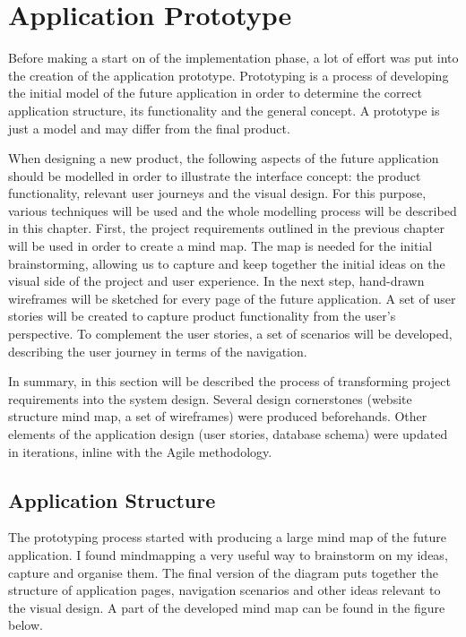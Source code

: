 \chapter{Application Prototype}
\label{ch:Prototype}
Before making a start on of the implementation phase, a lot of effort was put into the creation of the application prototype. Prototyping is a process of developing the initial model of the future application in order to determine the correct application structure, its functionality and the general concept. A prototype is just a model and may differ from the final product.

When designing a new product, the following aspects of the future application should be modelled in order to illustrate the interface concept: the product functionality, relevant user journeys and the visual design. For this purpose, various techniques will be used and the whole modelling process will be described in this chapter. First, the project requirements outlined in the previous chapter will be used in order to create a mind map. The map is needed for the initial brainstorming, allowing us to capture and keep together the initial ideas on the visual side of the project and user experience. In the next step, hand-drawn wireframes will be sketched for every page of the future application. A set of user stories will be created to capture product functionality from the user's perspective. To complement the user stories, a set of scenarios will be developed, describing the user journey in terms of the navigation. 



In summary, in this section will be described the process of transforming project requirements into the system design. Several design cornerstones (website structure mind map, a set of wireframes) were produced beforehands. Other elements of the application design (user stories, database schema) were updated in iterations, inline with the Agile methodology. 

\section{Application Structure}
\label{sec:applicationstructure_prototype}
The prototyping process started with producing a large mind map of the future application. I found mindmapping a very useful way to brainstorm on my ideas, capture and organise them. The final version of the diagram puts together the structure of application pages, navigation scenarios and other ideas relevant to the visual design. A part of the developed mind map can be found in the figure below.


